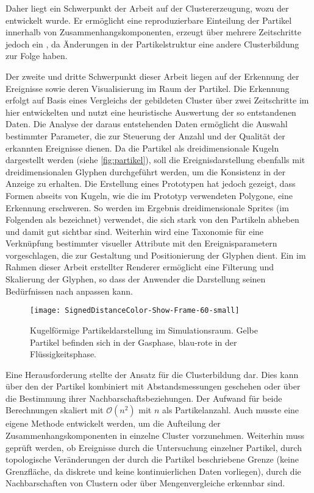 Daher liegt ein Schwerpunkt der Arbeit auf der Clustererzeugung, wozu der \CFD entwickelt wurde. Er ermöglicht eine reproduzierbare Einteilung der Partikel innerhalb von Zusammenhangskomponenten, erzeugt über mehrere Zeitschritte jedoch ein , da Änderungen in der Partikelstruktur eine andere Clusterbildung zur Folge haben.

Der zweite und dritte Schwerpunkt dieser Arbeit liegen auf der Erkennung der Ereignisse sowie deren Visualisierung im Raum der Partikel. Die Erkennung erfolgt auf Basis eines Vergleichs der gebildeten Cluster über zwei Zeitschritte im hier entwickelten \SECC und nutzt eine heuristische Auswertung der so entstandenen Daten. Die Analyse der daraus entstehenden Daten ermöglicht die Auswahl bestimmter Parameter, die zur Steuerung der Anzahl und der Qualität der erkannten Ereignisse dienen.
Da die Partikel als dreidimensionale Kugeln dargestellt werden (siehe \autoref{fig:partikel}), soll die Ereignisdarstellung ebenfalls mit dreidimensionalen Glyphen durchgeführt werden, um die Konsistenz in der Anzeige zu erhalten. Die Erstellung eines Prototypen hat jedoch gezeigt, dass Formen abseits von Kugeln, wie die im Prototyp verwendeten Polygone, eine Erkennung erschweren. So werden im Ergebnis dreidimensionale Sprites (im Folgenden als  bezeichnet) verwendet, die sich stark von den Partikeln abheben und damit gut sichtbar sind. Weiterhin wird eine Taxonomie für eine Verknüpfung bestimmter visueller Attribute mit den Ereignisparametern vorgeschlagen, die zur Gestaltung und Positionierung der Glyphen dient. Ein im Rahmen dieser Arbeit erstellter Renderer ermöglicht eine Filterung und Skalierung der Glyphen, so dass der Anwender die Darstellung seinen Bedürfnissen nach anpassen kann.

\begin{figure}
	\texttt{[image: SignedDistanceColor-Show-Frame-60-small]}
	\caption{Kugelförmige Partikeldarstellung im Simulationsraum. Gelbe Partikel befinden sich in der Gasphase, blau-rote in der Flüssigkeitsphase.}\label{fig:partikel}
\end{figure}

Eine Herausforderung stellte der Ansatz für die Clusterbildung dar. Dies kann über den  der Partikel kombiniert mit Abstandsmessungen geschehen oder über die Bestimmung ihrer Nachbarschaftsbeziehungen. Der Aufwand für beide Berechnungen skaliert mit $\mathcal{O}(n^2)$ mit $n$ als Partikelanzahl. %
Auch musste eine eigene Methode entwickelt werden, um die Aufteilung der Zusammenhangskomponenten in einzelne Cluster vorzunehmen. %
Weiterhin muss geprüft werden, ob Ereignisse durch die Untersuchung einzelner Partikel, durch topologische Veränderungen der durch die Partikel beschriebene Grenze (keine Grenzfläche, da diskrete und keine kontinuierlichen Daten vorliegen), durch die Nachbarschaften von Clustern oder über Mengenvergleiche erkennbar sind.

